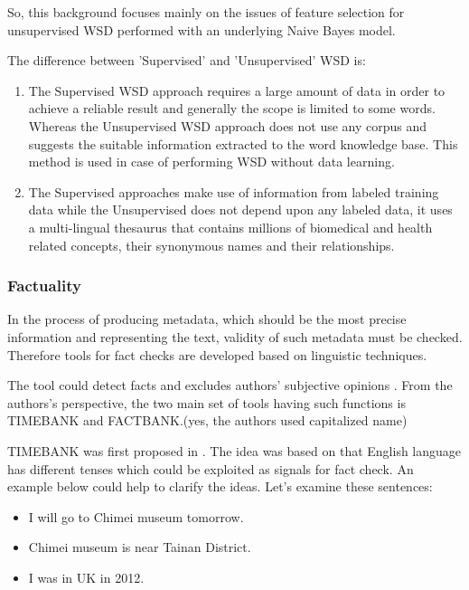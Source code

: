 So, this background focuses mainly on the issues of feature selection for unsupervised WSD performed with an underlying Naive Bayes model.

The difference between 'Supervised' and 'Unsupervised' WSD is:

\begin{enumerate}
	\item The Supervised WSD approach requires a large amount of data in order to achieve a reliable result and generally the scope is limited to some words. 
	Whereas the Unsupervised WSD approach does not use any corpus and suggests the suitable information extracted to the word knowledge base.
	This method is used in case of performing WSD without data learning.
	\item The Supervised approaches make use of information from labeled training data while the Unsupervised does not depend upon any labeled data, 
	it uses a multi-lingual thesaurus that contains millions of biomedical and health related concepts, their synonymous names and their relationships.
\end{enumerate}


\subsubsection*{Factuality}

In the process of producing metadata, which should be the most precise information and representing the text, validity of such metadata must be checked. 
Therefore tools for fact checks are developed based on linguistic techniques. 

The tool could detect facts and excludes authors' subjective opinions \cite{Agerri2014}. 
From the authors's perspective, the two main set of tools having such functions is TIMEBANK and FACTBANK.(yes, the authors used capitalized name)

TIMEBANK was first proposed in \cite{pustejovsky2003timebank}. 
The idea was based on that English language has different tenses which could be exploited as signals for fact check. 
An example below could help to clarify the ideas. Let's examine these sentences:

\begin{itemize}
	\item I will go to Chimei museum tomorrow.
	\item Chimei museum is near Tainan District.
	\item I was in UK in 2012.
\end{itemize}

